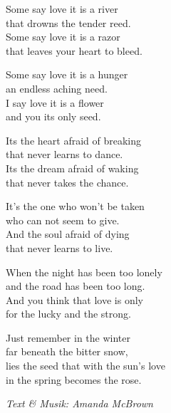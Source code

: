 \vspace{10pt}
Some say love it is a river\\
that drowns the tender reed.\\
Some say love it is a razor\\
that leaves your heart to bleed.\par
\vspace{10pt}
Some say love it is a hunger\\
an endless aching need.\\
I say love it is a flower\\
and you its only seed.\par
\vspace{10pt}
Its the heart afraid of breaking\\
that never learns to dance.\\
Its the dream afraid of waking\\
that never takes the chance.\par
\vspace{10pt}
It's the one who won't be taken\\
who can not seem to give.\\
And the soul afraid of dying\\
that never learns to live.\par
\vspace{10pt}
When the night has been too lonely\\
and the road has been too long.\\
And you think that love is only\\
for the lucky and the strong.\par
\vspace{10pt}
Just remember in the winter\\
far beneath the bitter snow,\\
lies the seed that with the sun's love\\
in the spring becomes the rose.
\par
\vspace{10pt}
{\footnotesize\textit{Text \& Musik: Amanda McBrown}}
